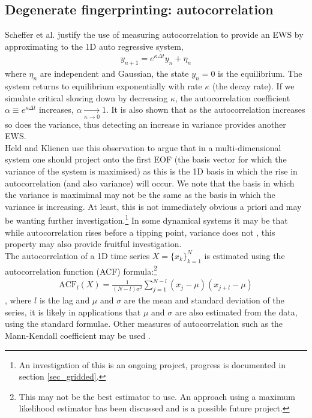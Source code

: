\documentclass[11pt,a4paper,reqno]{article}
\numberwithin{equation}{section}
\begin{document}
\subsection{Degenerate fingerprinting: autocorrelation}

Scheffer et al. \cite{scheffer2009} justify the use of measuring autocorrelation to provide an EWS by approximating to the 1D auto regressive system,
\begin{align}
y_{n+1} = e^{\kappa\Delta t}y_{n} + \eta_n
\end{align}
where $\eta_n$ are independent and Gaussian, the state $y_n=0$ is the equilibrium. The system returns to equilibrium exponentially with rate $\kappa$ (the decay rate). If we simulate critical slowing down by decreasing $\kappa$, the autocorrelation coefficient $\alpha \equiv e^{\kappa\Delta t}$ increases, $\alpha\xrightarrow[\kappa\rightarrow 0]{}1$. It is also shown that as the autocorrelation increases so does the variance, thus detecting an increase in variance provides another EWS. \\

Held and Klienen \cite{held2004} use this observation to argue that in a multi-dimensional system one should project onto the first EOF (the basis vector for which the variance of the system is maximised) as this is the 1D basis in which the rise in autocorrelation (and also variance) will occur. We note that the basis in which the variance is maximimal may not be the same as the basis in which the variance is increasing. At least, this is not immediately obvious a priori and may be wanting further investigation.\footnote{An investigation of this is an ongoing project, progress is documented in section \ref{sec_gridded}.}\marginpar{\large $\star$} In some dynamical systems it may be that while autocorrelation rises before a tipping point, variance does not \cite{gsell2016}, this property may also provide fruitful investigation.\\

The autocorrelation of a 1D time series $X=\{x_k\}_{k=1}^{N}$ is estimated using the autocorrelation function (ACF) formula:\footnote{This may not be the best estimator to use. An approach using a maximum likelihood estimator has been discussed and is a possible future project.}\marginpar{\large $\star$}
\begin{align}
\label{eqn_ACF_formula}
\text{ACF}_{l}(X) = \frac{1}{(N-l)\sigma^2}\sum_{j=1}^{N-l}(x_{j}-\mu)(x_{j+l} - \mu)
\end{align} 
\cite{held2004}, where $l$ is the lag and $\mu$ and $\sigma$ are the mean and standard deviation of the series, it is likely in applications that $\mu$ and $\sigma$ are also estimated from the data, using the standard formulae. Other measures of autocorrelation such as the Mann-Kendall coefficient may be used \cite{yue2002}.\\
\end{document}
